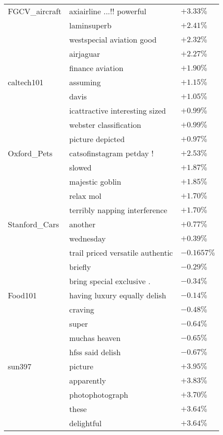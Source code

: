 \begin{longtable}{|>{\raggedright\arraybackslash}p{3cm}|>{\raggedright\arraybackslash}p{7cm}|>{\raggedright\arraybackslash}p{2cm}|}
FGCV\_aircraft & axiairline ...!! powerful & $+3.33\%$ \\
               & laminsuperb & $+2.41\%$ \\
               & westspecial aviation good & $+2.32\%$ \\
               & airjaguar & $+2.27\%$ \\
               & finance aviation & $+1.90\%$ \\
\hline

caltech101 & assuming & $+1.15\%$ \\
           & davis & $+1.05\%$ \\
           & icattractive interesting sized & $+0.99\%$ \\
           & webster classification & $+0.99\%$ \\
           & picture depicted & $+0.97\%$ \\
\hline

Oxford\_Pets & catsofinstagram petday ! & $+2.53\%$ \\
             & slowed & $+1.87\%$ \\
             & majestic goblin & $+1.85\%$ \\
             & relax mol & $+1.70\%$ \\
             & terribly napping interference & $+1.70\%$ \\
\hline

Stanford\_Cars & another & $+0.77\%$ \\
               & wednesday & $+0.39\%$ \\
               & trail priced versatile authentic & $-0.1657\%$ \\
               & briefly & $-0.29\%$ \\
               & bring special exclusive . & $-0.34\%$ \\
\hline

Food101 & having luxury equally delish & $-0.14\%$ \\
        & craving & $-0.48\%$ \\
        & super & $-0.64\%$ \\
        & muchas heaven & $-0.65\%$ \\
        & hfss said delish & $-0.67\%$ \\
\hline

sun397 & picture & $+3.95\%$ \\
       & apparently & $+3.83\%$ \\
       & photophotograph & $+3.70\%$ \\
       & these & $+3.64\%$ \\
       & delightful & $+3.64\%$ \\
\hline

\end{longtable}